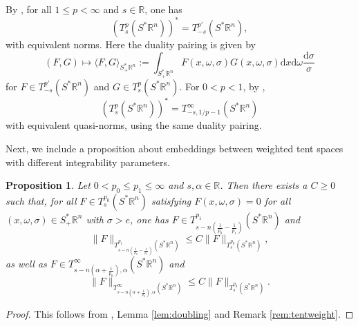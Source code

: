 \documentclass{amsart}
\newcommand {\ud}{\mathrm{d}}
\newcommand {\rb}{\rangle}
\newcommand {\lb}{\langle}
\newcommand {\R}{\mathbb R}
\newcommand {\Rn}{\mathbb{R}^{n}}
\newcommand {\Sp}{S^{*}\Rn}
\newcommand {\Spp}{S^{*}_{+}\Rn}
\newcommand {\w}{\omega}
\newtheorem{proposition}[theorem]{Proposition}
\theoremstyle{definition}
\numberwithin{equation}{section}
\begin{document}
By \cite[Proposition 1.9]{Amenta18}, for all $1\leq p<\infty$ and $s\in\R$, one has
\begin{equation}\label{eq:tentdual}
(T^{p}_{s}(\Sp))^{*}=T^{p'}_{-s}(\Sp),
\end{equation}
with equivalent norms. Here the duality pairing is given by
\begin{equation}\label{eq:pairing}
(F,G)\mapsto\lb F,G\rb_{\Spp}:=\int_{\Spp}F(x,\w,\sigma)G(x,\w,\sigma)\ud x\ud \w\frac{\ud \sigma}{\sigma}
\end{equation}
for $F\in T^{p'}_{-s}(\Sp)$ and $G\in T^{p}_{s}(\Sp)$. For $0<p<1$, by \cite[Theorem 1.11]{Amenta18},
\begin{equation}\label{eq:tentdual1}
(T^{p}_{s}(\Sp))^{*}=T^{\infty}_{-s,1/p-1}(\Sp)
\end{equation}
with equivalent quasi-norms, using the same duality pairing.






Next, we include a proposition about embeddings between weighted tent spaces with different integrability parameters.

\begin{proposition}\label{prop:tentembedding}
Let $0<p_{0}\leq p_{1}\leq \infty$ and $s,\alpha\in\R$. Then there exists a $C\geq0$ such that, for all $F\in T^{p_{0}}_{s}(\Sp)$ satisfying $F(x,\w,\sigma)=0$ for all $(x,\w,\sigma)\in\Spp$ with $\sigma>e$, one has $F\in T^{p_{1}}_{s-n(\frac{1}{p_{0}}-\frac{1}{p_{1}})}(\Sp)$ and
\[
\|F\|_{T^{p_{1}}_{s-n(\frac{1}{p_{0}}-\frac{1}{p_{1}})}(\Sp)}\leq C\|F\|_{T^{p_{0}}_{s}(\Sp)},
\]
as well as $F\in T^{\infty}_{s-n(\alpha+\frac{1}{p_{0}}),\alpha}(\Sp)$ and
\[
\|F\|_{T^{\infty}_{s-n(\alpha+\frac{1}{p_{0}}),\alpha}(\Sp)}\leq C \|F\|_{T^{p_{0}}_{s}(\Sp)}.
\]
\end{proposition}
\begin{proof}
This follows from \cite[Theorem 2.19]{Amenta18}, Lemma \ref{lem:doubling} and Remark \ref{rem:tentweight}.
\end{proof}
\end{document}
